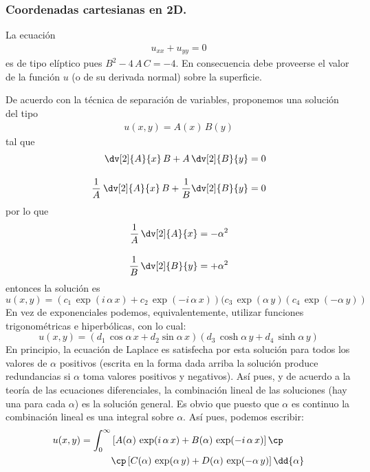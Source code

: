 \subsubsection{Coordenadas cartesianas en 2D.}
La ecuación 
\begin{align*}
u_{xx} + u_{yy} = 0
\end{align*} 
es de tipo elíptico pues $B^{2} - 4 \, A \, C = -4$. En consecuencia debe proveerse el valor de la función $u$ (o de su derivada normal) sobre la superficie.
\par
De acuerdo con la técnica de separación de variables, proponemos una solución del tipo
\begin{align*}
u(x, y) = A(x) \, B(y)
\end{align*}
tal que
\begin{align*}
\dv[2]{A}{x} \, B + A \, \dv[2]{B}{y} = 0  \\[1em]
\dfrac{1}{A} \: \dv[2]{A}{x} \, B + \dfrac{1}{B} \dv[2]{B}{y} = 0
\end{align*}
por lo que
\begin{align*}
\dfrac{1}{A} \, \dv[2]{A}{x} = - \alpha^{2} \\[1em]
\dfrac{1}{B} \, \dv[2]{B}{y} = + \alpha^{2}
\end{align*}
entonces la solución es
\begin{equation}
u(x, y) = (c_{1} \, \exp(i \, \alpha \, x) + c_{2} \, \exp(-i \, \alpha \, x))(c_{3} \, \exp(\alpha \, y)(c_{4} \, \exp(-\alpha \, y))
\label{eq:ecuacion_03_033}
\end{equation}
En vez de exponenciales podemos, equivalentemente, utilizar funciones trigonométricas e hiperbólicas, con lo cual:
\begin{equation}
u(x, y) = (d_{1} \, \cos \alpha \, x + d_{2} \sin \alpha \, x)(d_{3} \, \cosh \alpha \, y + d_{4} \, \sinh \alpha \, y)
\label{eq:ecuacion_03_034}
\end{equation}
En principio, la ecuación de Laplace es satisfecha por esta solución para todos los valores de $\alpha$ positivos (escrita en la forma dada arriba la solución produce redundancias si $\alpha$ toma valores positivos y negativos). Así pues, y de acuerdo a la teoría de las ecuaciones diferenciales, la combinación lineal de las soluciones (hay una para cada $\alpha$) es la solución general. Es obvio que puesto que $\alpha$ es continuo la combinación lineal es una integral sobre $\alpha$. Así pues, podemos escribir:
\begin{align}
\begin{aligned}
u(x,y) = \int_{0}^{\infty} & \left[ A(\alpha) \, \exp(i \, \alpha \, x) + B(\alpha) \, \exp(-i \, \alpha \, x) \right] \cp \\
& \cp \left[  C(\alpha) \, \exp(\alpha \, y) + D(\alpha) \, \exp(-\alpha \, y) \right] \dd{\alpha}
\end{aligned}
\label{eq:ecuacion_03_035}
\end{align}
